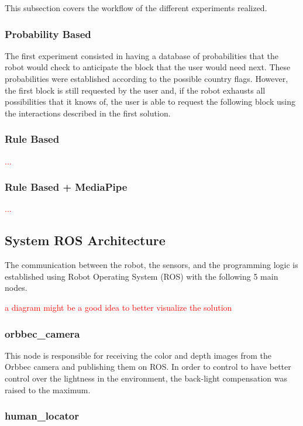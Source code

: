 This subsection covers the workflow of the different experiments realized.

\subsubsection{Probability Based}

The first experiment consisted in having a database of probabilities that the robot would check to anticipate the block that the user would need next. These probabilities were established according to the possible country flags. However, the first block is still requested by the user and, if the robot exhausts all possibilities that it knows of, the user is able to request the following block using the interactions described in the first solution.

\subsubsection{Rule Based}

\textcolor{red}{...}

\subsubsection{Rule Based + MediaPipe}

\textcolor{red}{...}

\subsection{System ROS Architecture}

The communication between the robot, the sensors, and the programming logic is established using Robot Operating System (ROS) with the following 5 main nodes.

\textcolor{red}{a diagram might be a good idea to better visualize the solution}

\subsubsection{orbbec\_camera}

This node is responsible for receiving the color and depth images from the Orbbec camera and publishing them on ROS. In order to control to have better control over the lightness in the environment, the back-light compensation was raised to the maximum.

\subsubsection{human\_locator}


